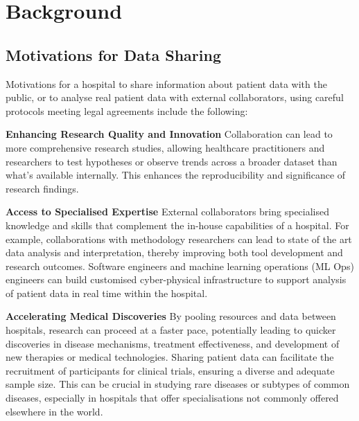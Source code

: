 \documentclass[11pt]{article}
\begin{document}
\section{Background}

\subsection{Motivations for Data Sharing}

Motivations for a hospital to share information about patient data with the public, or to analyse real patient data with external collaborators, using careful protocols meeting legal agreements include the following:

\textbf{Enhancing Research Quality and Innovation} 
Collaboration can lead to more comprehensive research studies, allowing healthcare practitioners and researchers to test hypotheses or observe trends across a broader dataset than what's available internally. This enhances the reproducibility and significance of research findings.

\textbf{Access to Specialised Expertise} 
External collaborators bring specialised knowledge and skills that complement the in-house capabilities of a hospital. For example, collaborations with methodology researchers can lead to state of the art data analysis and interpretation, thereby improving both tool development and research outcomes. Software engineers and machine learning operations (ML Ops) engineers can build customised cyber-physical infrastructure to support analysis of patient data in real time within the hospital.

\textbf{Accelerating Medical Discoveries}
By pooling resources and data between hospitals, research can proceed at a faster pace, potentially leading to quicker discoveries in disease mechanisms, treatment effectiveness, and development of new therapies or medical technologies. Sharing patient data can facilitate the recruitment of participants for clinical trials, ensuring a diverse and adequate sample size. This can be crucial in studying rare diseases or subtypes of common diseases, especially in hospitals that offer specialisations not commonly offered elsewhere in the world. 
\end{document}

